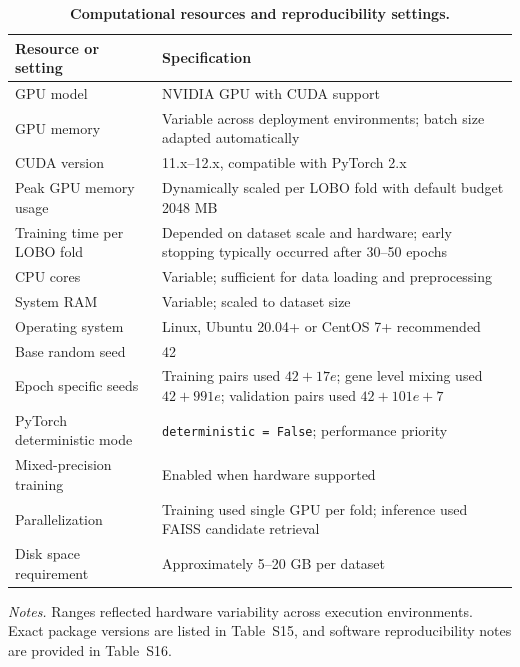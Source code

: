 \documentclass[11pt]{article}
\begin{document}
\begin{table}[htbp]
\centering
\caption{\textbf{Computational resources and reproducibility settings.}}
\label{tab:s17_compute_resources}
\scriptsize
\begin{tabularx}{\textwidth}{@{}L{0.24\textwidth} Y@{}}
\toprule
\textbf{Resource or setting} & \textbf{Specification} \\
\midrule
GPU model & NVIDIA GPU with CUDA support \\
GPU memory & Variable across deployment environments; batch size adapted automatically \\
CUDA version & 11.x--12.x, compatible with PyTorch 2.x \\
Peak GPU memory usage & Dynamically scaled per LOBO fold with default budget 2048 MB \\
Training time per LOBO fold & Depended on dataset scale and hardware; early stopping typically occurred after 30--50 epochs \\
CPU cores & Variable; sufficient for data loading and preprocessing \\
System RAM & Variable; scaled to dataset size \\
Operating system & Linux, Ubuntu 20.04+ or CentOS 7+ recommended \\
Base random seed & 42 \\
Epoch specific seeds & Training pairs used \(42+17e\); gene level mixing used \(42+991e\); validation pairs used \(42+101e+7\) \\
PyTorch deterministic mode & \texttt{deterministic = False}; performance priority \\
Mixed-precision training & Enabled when hardware supported \\
Parallelization & Training used single GPU per fold; inference used FAISS candidate retrieval \\
Disk space requirement & Approximately 5--20 GB per dataset \\
\bottomrule
\end{tabularx}

\vspace{0.5em}
{\raggedright\scriptsize\textit{Notes.} Ranges reflected hardware variability across execution environments. Exact package versions are listed in Table~S15, and software reproducibility notes are provided in Table~S16.\par}
\end{table}

\FloatBarrier

\clearpage
\end{document}
